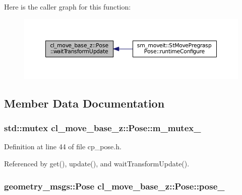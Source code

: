 Here is the caller graph for this function\+:
\nopagebreak
\begin{figure}[H]
\begin{center}
\leavevmode
\includegraphics[width=350pt]{classcl__move__base__z_1_1Pose_a5f8576c3dacfb2f2e7f9df5105c480ea_icgraph}
\end{center}
\end{figure}




\subsection{Member Data Documentation}
\subsubsection[{\texorpdfstring{m\+\_\+mutex\+\_\+}{m_mutex_}}]{\setlength{\rightskip}{0pt plus 5cm}std\+::mutex cl\+\_\+move\+\_\+base\+\_\+z\+::\+Pose\+::m\+\_\+mutex\+\_\+\hspace{0.3cm}{\ttfamily [private]}}\hypertarget{classcl__move__base__z_1_1Pose_a73ed2daba3e473e156cab751fb37b58f}{}\label{classcl__move__base__z_1_1Pose_a73ed2daba3e473e156cab751fb37b58f}


Definition at line 44 of file cp\+\_\+pose.\+h.



Referenced by get(), update(), and wait\+Transform\+Update().

\subsubsection[{\texorpdfstring{pose\+\_\+}{pose_}}]{\setlength{\rightskip}{0pt plus 5cm}geometry\+\_\+msgs\+::\+Pose cl\+\_\+move\+\_\+base\+\_\+z\+::\+Pose\+::pose\+\_\+\hspace{0.3cm}{\ttfamily [private]}}\hypertarget{classcl__move__base__z_1_1Pose_a07159b1632042a0292ffcc39995da81e}{}\label{classcl__move__base__z_1_1Pose_a07159b1632042a0292ffcc39995da81e}


